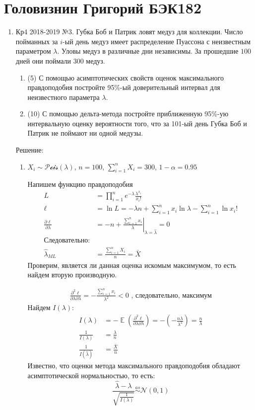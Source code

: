 \documentclass[a4paper,11pt]{article}
\DeclareMathOperator{\E}{\mathbb{E}}
\newcommand{\cN}{\mathcal{N}}
\newcommand{\cPois}{\mathcal{Pois}}
\begin{document}

\section{Головизнин Григорий БЭК182}

\begin{enumerate}
\item Кр4 2018-2019 №3. Губка Боб и Патрик ловят медуз для коллекции. Число пойманных за $i$-ый день медуз имеет распределение Пуассона с неизвестным параметром $\lambda$. Уловы медуз в различные дни независимы. За прошедшие $100$ дней они поймали $300$ медуз. \label{Кр4 2018-2019 №3}

\begin{enumerate}
    \item (5) С помощью асимптотических свойств оценок максимального правдоподобия постройте 95\%-ый доверительный интервал для неизвестного параметра $\lambda$.
    \item (10) С помощью дельта-метода постройте приближенную 95\%-ую интервальную оценку вероятности того, что за 101-ый день Губка Боб и Патрик не поймают ни одной медузы.
\end{enumerate}

Решение:
\begin{enumerate}
	\item $X_{i} \sim \cPois(\lambda)$, $n = 100$, $\sum_{i=1}^n X_i = 300$, $1-\alpha = 0.95$

Напишем функцию правдоподобия
\begin{align*}
L &= \prod_{i=1}^n e^{-\lambda} \frac{\lambda^{x_i}}{x_i !} \\
\ell &= \ln L = - \lambda n + \sum_{i=1}^n x_i \ln \lambda - \sum_{i=1}^n \ln x_i! \\
\frac{\partial \ell}{\partial \lambda} &= \left. -n + \frac{\sum_{i=1}^n x_i}{\lambda} \right|_{\lambda = \hat \lambda} = 0  \\
\text{Следовательно:} \\
\hat \lambda_{ML} &= \frac{\sum_{i=1}^n X_i}{n} = \bar X
\end{align*}
Проверим, является ли данная оценка искомым максимумом, то есть найдем вторую производную.

\begin{align*}
	\frac{\partial^2 \ell}{\partial \lambda \partial \lambda} = - \frac{\sum_{i=1}^n x_i}{\lambda^2} < 0 \text{ , следовательно, максимум}
\end{align*}
Найдем $I(\lambda)$:
\begin{align*}
I(\lambda) &= -\E \left(\frac{\partial^2 \ell}{\partial \lambda \partial \lambda} \right) = 
- \left(-\frac{n\lambda}{\lambda^2}\right) = \frac{n}{\lambda} \\
\frac{1}{I(\lambda)} &= \frac{\lambda}{n} \\
\frac{1}{I(\hat {\lambda})} &= \frac{\bar X}{n}
\end{align*}
Известно, что оценки метода максимального правдоподобия обладают асимптотической нормальностью, то есть:
\[
\frac{\hat \lambda - \lambda}{\sqrt{\frac{1}{I(\lambda)}}} \stackrel{as}{\sim} \cN(0,1)
\]


\end{enumerate}
\end{enumerate}
\end{document}
